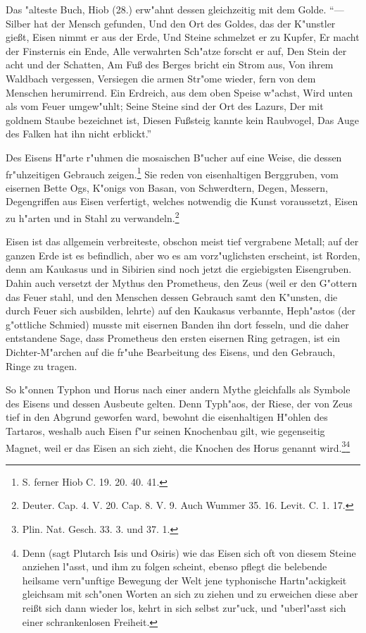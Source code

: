 \documentclass[a4paper, 11pt, oneside, polutonikogreek, german]{article}
\begin{document}
Das "alteste Buch, Hiob (28.) erw"ahnt dessen gleichzeitig mit dem Golde. "`--- Silber hat der Mensch gefunden, Und den Ort des Goldes, das der K"unstler gießt, Eisen nimmt er aus der Erde, Und Steine schmelzet er zu Kupfer, Er macht der Finsternis ein Ende, Alle verwahrten Sch"atze forscht er auf, Den Stein der acht und der Schatten, Am Fuß des Berges bricht ein Strom aus, Von ihrem Waldbach vergessen, Versiegen die armen Str"ome wieder, fern von dem Menschen herumirrend. Ein Erdreich, aus dem oben Speise w"achst, Wird unten als vom Feuer umgew"uhlt; Seine Steine sind der Ort des Lazurs, Der mit goldnem Staube bezeichnet ist, Diesen Fußsteig kannte kein Raubvogel, Das Auge des Falken hat ihn nicht erblickt."'

Des Eisens H"arte r"uhmen die mosaischen B"ucher auf eine Weise, die dessen fr"uhzeitigen Gebrauch zeigen.\footnote{S. ferner Hiob C. 19. 20. 40. 41.} Sie reden von eisenhaltigen Berggruben, vom eisernen Bette Ogs, K"onigs von Basan, von Schwerdtern, Degen, Messern, Degengriffen aus Eisen verfertigt, welches notwendig die Kunst voraussetzt, Eisen zu h"arten und in Stahl zu verwandeln.\footnote{Deuter. Cap. 4. V. 20. Cap. 8. V. 9. Auch Wummer 35. 16. Levit. C. 1. 17.}

Eisen ist das allgemein verbreiteste, obschon meist tief vergrabene Metall; auf der ganzen Erde ist es befindlich, aber wo es am vorz"uglichsten erscheint, ist Rorden, denn am Kaukasus und in Sibirien sind noch jetzt die ergiebigsten Eisengruben. Dahin auch versetzt der Mythus den Prometheus, den Zeus (weil er den G"ottern das Feuer stahl, und den Menschen dessen Gebrauch samt den K"unsten, die durch Feuer sich ausbilden, lehrte) auf den Kaukasus verbannte, Heph"astos (der g"ottliche Schmied) musste mit eisernen Banden ihn dort fesseln, und die daher entstandene Sage, dass Prometheus den ersten eisernen Ring getragen, ist ein Dichter-M"archen auf die fr"uhe Bearbeitung des Eisens, und den Gebrauch, Ringe zu tragen.

So k"onnen Typhon und Horus nach einer andern Mythe gleichfalls als Symbole des Eisens und dessen Ausbeute gelten. Denn Typh"aos, der Riese, der von Zeus tief in den Abgrund geworfen ward, bewohnt die eisenhaltigen H"ohlen des Tartaros, weshalb auch Eisen f"ur seinen Knochenbau gilt, wie gegenseitig Magnet, weil er das Eisen an sich zieht, die Knochen des Horus genannt wird.\footnote{Plin. Nat. Gesch. 33. 3. und 37. 1.}\footnote{Denn (sagt Plutarch Isis und Osiris) wie das Eisen sich oft von diesem Steine anziehen l"asst, und ihm zu folgen scheint, ebenso pflegt die belebende heilsame vern"unftige Bewegung der Welt jene typhonische Hartn"ackigkeit gleichsam mit sch"onen Worten an sich zu ziehen und zu erweichen diese aber reißt sich dann wieder los, kehrt in sich selbst zur"uck, und "uberl"asst sich einer schrankenlosen Freiheit.}
\end{document}
